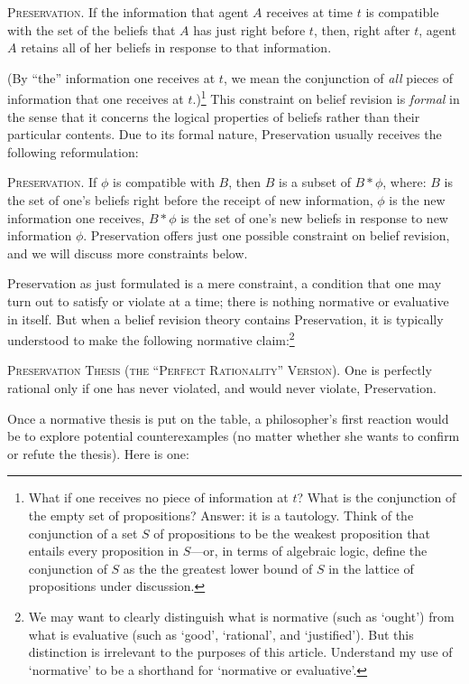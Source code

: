 	\xm \textsc{Preservation.} If the information that agent $A$ receives at time $t$ is compatible with the set of the beliefs that $A$ has just right before $t$, then, right after $t$, agent $A$ retains all of her beliefs in response to that information. 

\ed (By ``the'' information one receives at $t$, we mean the conjunction of {\em all} pieces of information that one receives at $t$.)\footnote
	{What if one receives no piece of information at $t$? What is the conjunction of the empty set of propositions? Answer: it is a tautology. Think of the conjunction of a set $S$ of propositions to be the weakest proposition that entails every proposition in $S$---or, in terms of algebraic logic, define the conjunction of $S$ as the the greatest lower bound of $S$ in the lattice of propositions under discussion.} 
This constraint on belief revision is {\em formal} in the sense that it concerns the logical properties of beliefs rather than their particular contents. Due to its formal nature, Preservation usually receives the following reformulation:\op

	\xm \textsc{Preservation.} If $\phi$ is compatible with $B$, then $B$ is a subset of $B * \phi$, where: \op
	\im $B$ is the set of one's beliefs right before the receipt of new information, 
	\im $\phi$ is the new information one receives,
	\im $B * \phi$ is the set of one's new beliefs in response to new information $\phi$.
	\ed
\ed Preservation offers just one possible constraint on belief revision, and we will discuss more constraints below. 

Preservation as just formulated is a mere constraint, a condition that one may turn out to satisfy or violate at a time; there is nothing normative or evaluative in itself. But when a belief revision theory contains Preservation, it is typically understood to make the following normative claim:\footnote
	{
	We may want to clearly distinguish what is normative (such as `ought') from what is evaluative (such as `good', `rational', and `justified'). But this distinction is irrelevant to the purposes of this article. Understand my use of `normative' to be a shorthand for `normative or evaluative'.
	} 
\op

	\xm \textsc{Preservation Thesis (the ``Perfect Rationality'' Version).} One is perfectly rational only if one has never violated, and would never violate, Preservation. 

\ed Once a normative thesis is put on the table, a philosopher's first reaction would be to explore potential counterexamples (no matter whether she wants to confirm or refute the thesis). Here is one: \op 
 
